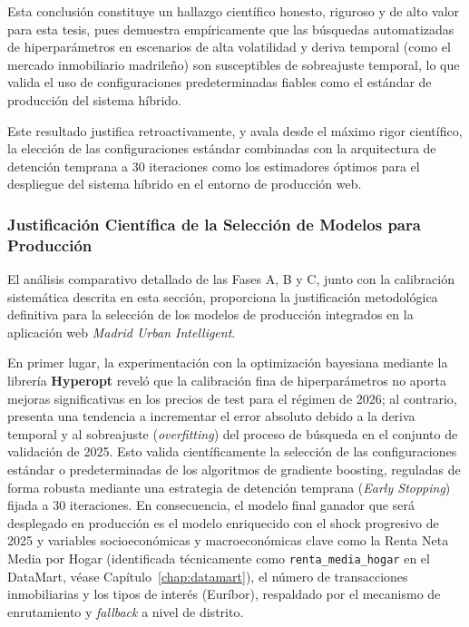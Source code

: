 \documentclass[a4paper,11pt,openany]{book}
\begin{document}
Esta conclusión constituye un hallazgo científico honesto, riguroso y de alto valor para esta tesis, pues demuestra empíricamente que las búsquedas automatizadas de hiperparámetros en escenarios de alta volatilidad y deriva temporal (como el mercado inmobiliario madrileño) son susceptibles de sobreajuste temporal, lo que valida el uso de configuraciones predeterminadas fiables como el estándar de producción del sistema híbrido.

Este resultado justifica retroactivamente, y avala desde el máximo rigor científico, la elección de las configuraciones estándar combinadas con la arquitectura de detención temprana a 30 iteraciones como los estimadores óptimos para el despliegue del sistema híbrido en el entorno de producción web.

\subsubsection{Justificación Científica de la Selección de Modelos para Producción}
El análisis comparativo detallado de las Fases A, B y C, junto con la calibración sistemática descrita en esta sección, proporciona la justificación metodológica definitiva para la selección de los modelos de producción integrados en la aplicación web \textit{Madrid Urban Intelligent}.

En primer lugar, la experimentación con la optimización bayesiana mediante la librería \textbf{Hyperopt} reveló que la calibración fina de hiperparámetros no aporta mejoras significativas en los precios de test para el régimen de 2026; al contrario, presenta una tendencia a incrementar el error absoluto debido a la deriva temporal y al sobreajuste (\textit{overfitting}) del proceso de búsqueda en el conjunto de validación de 2025. Esto valida científicamente la selección de las configuraciones estándar o predeterminadas de los algoritmos de gradiente boosting, reguladas de forma robusta mediante una estrategia de detención temprana (\textit{Early Stopping}) fijada a 30 iteraciones. En consecuencia, el modelo final ganador que será desplegado en producción es el modelo enriquecido con el shock progresivo de 2025 y variables socioeconómicas y macroeconómicas clave como la Renta Neta Media por Hogar (identificada técnicamente como \texttt{renta\_media\_hogar} en el DataMart, véase Capítulo~\ref{chap:datamart}), el número de transacciones inmobiliarias y los tipos de interés (Euríbor), respaldado por el mecanismo de enrutamiento y \textit{fallback} a nivel de distrito.
\end{document}
